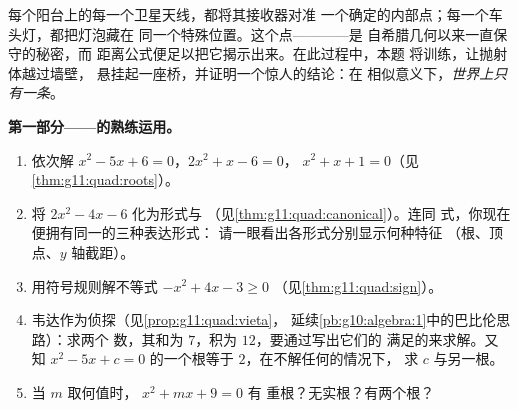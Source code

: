 \begin{problem}
\label{pb:g11:quad:1}
每个阳台上的每一个卫星天线，都将其接收器对准
一个确定的内部点；每一个车头灯，都把灯泡藏在
同一个特殊位置。这个点——\emph{}——是
自希腊几何以来一直保守的秘密，而
距离公式便足以把它揭示出来。在此过程中，本题
将训练，让抛射体越过墙壁，
悬挂起一座桥，并证明一个惊人的结论：在
相似意义下，\emph{世界上只有一条}。

\medskip
\noindent\textbf{第一部分——的熟练运用。}
\begin{enumerate}
  \item 依次解 $x^2 - 5x + 6 = 0$，$2x^2 + x - 6 = 0$，
        $x^2 + x + 1 = 0$（见\cref{thm:g11:quad:roots}）。
  \item 将 $2x^2 - 4x - 6$ 化为形式与
        （见\cref{thm:g11:quad:canonical}）。连同
        式，你现在便拥有同一的三种表达形式：
        请一眼看出各形式分别显示何种特征
        （根、顶点、$y$ 轴截距）。
  \item 用符号规则解不等式 $-x^2 + 4x - 3 \geq 0$
        （见\cref{thm:g11:quad:sign}）。
  \item 韦达作为侦探（见\cref{prop:g11:quad:vieta}，
        延续\cref{pb:g10:algebra:1}中的巴比伦思路）：求两个
        数，其和为 $7$，积为 $12$，要通过写出它们的
        满足的来求解。又知 $x^2 - 5x + c = 0$ 的一个根等于
        $2$，在不解任何的情况下，
        求 $c$ 与另一根。
  \item 当 $m$ 取何值时， $x^2 + mx + 9 = 0$ 有
        重根？无实根？有两个根？
\end{enumerate}


\end{problem}
